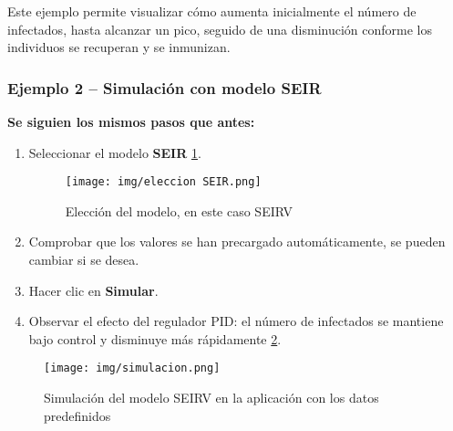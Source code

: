 Este ejemplo permite visualizar cómo aumenta inicialmente el número de infectados, hasta alcanzar un pico, seguido de una disminución conforme los individuos se recuperan y se inmunizan.

\vspace{1em}
\subsubsection{Ejemplo 2 – Simulación con modelo SEIR}

\textbf{Se siguien los mismos pasos que antes:}
\begin{enumerate}
    \item Seleccionar el modelo \textbf{SEIR} \ref{fig:eleccion seirv}.

    \begin{figure}[H]
        \centering
        \texttt{[image: img/eleccion SEIR.png]}
        \caption{Elección del modelo, en este caso SEIRV}
        \label{fig:eleccion seirv}
        \vspace{0.5cm} %
    \end{figure}
    \item Comprobar que los valores se han precargado automáticamente, se pueden cambiar si se desea.
    \item Hacer clic en \textbf{Simular}.
    \item Observar el efecto del regulador PID: el número de infectados se mantiene bajo control y disminuye más rápidamente \ref{fig:eseeir}.
\end{enumerate}




\begin{figure}[H]
        \centering
        \texttt{[image: img/simulacion.png]}
        \caption{Simulación del modelo SEIRV en la aplicación con los datos predefinidos}
        \label{fig:eseeir}
        \vspace{0.5cm} %
    \end{figure}









